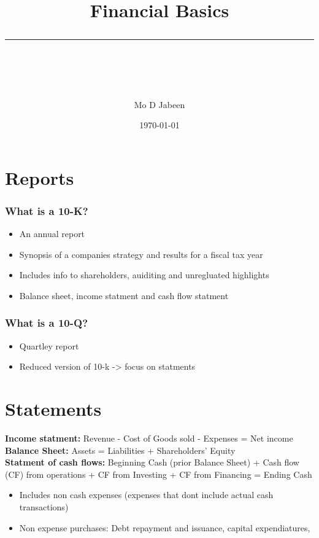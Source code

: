 \documentclass[11pt]{scrartcl} %
\title{	
	\normalfont\normalsize
	\vspace{20pt} %
	{\huge Financial Basics}\\ %
	\vspace{12pt} %
	\rule{\linewidth}{2pt}\\ %
}
\author{\small Mo D Jabeen} %
\date{\normalsize\today} %
\begin{document}
\maketitle %

\section{Reports}

\subsubsection{What is a 10-K?}

\begin{itemize}
	\item An annual report
	\item Synopsis of a companies strategy and results for a fiscal tax year
	\item Includes info to shareholders, auiditing and unregluated highlights
	\item Balance sheet, income statment and cash flow statment 
\end{itemize}

\subsubsection{What is a 10-Q?}

\begin{itemize}
	\item Quartley report
	\item Reduced version of 10-k -> focus on statments 
\end{itemize}

\section{Statements}

\textbf{Income statment:} Revenue - Cost of Goods sold - Expenses = Net income \\
\textbf{Balance Sheet:} Assets = Liabilities + Shareholders' Equity\\
\textbf{Statment of cash flows:} Beginning Cash (prior Balance Sheet) + Cash flow (CF) from operations + CF from Investing + CF from Financing = Ending Cash

\begin{itemize}
	\item Includes non cash expenses (expenses that dont include actual cash transactions)
	\item Non expense purchases: Debt repayment and issuance, capital expendiatures, 
\end{itemize}
\end{document}
